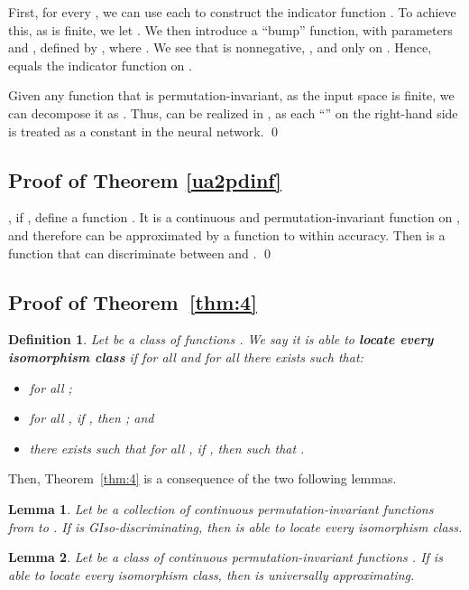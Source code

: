 \documentclass{article}
\newtheorem{lemma}{Lemma}
\newtheorem{definition}{Definition}
\begin{document}
First, for every , we can use each  to construct the indicator function . To achieve this, as  is finite, we let . We then introduce a ``bump'' function,  with parameters  and , defined by , where . We see that  is nonnegative, , and  only on . Hence,  equals the indicator function  on .

Given any function  that is permutation-invariant, as the input space  is finite, we can decompose it as
.
Thus,  can be realized in , as each ``'' on the right-hand side is treated as a constant in the neural network.
\qed

\subsection{Proof of Theorem \ref{ua2pdinf}}
\label{app:pf_thm3}
, if , define a function . It is a continuous and permutation-invariant function on , and therefore can be approximated by a function  to within  accuracy. Then  is a function that can discriminate between  and . \qed

\subsection{Proof of Theorem~\ref{thm:4}}
\label{app:pf_thm4}
\begin{definition}
\label{locate}
Let  be a class of functions . We say it is able to \textbf{locate every isomorphism class} if for all  and for all  there exists  such that:
\begin{itemize}
    \item for all ;
    \item for all , if , then ; and
    \item there exists  such that for all , if , then  such that .
\end{itemize}
\end{definition}

Then, Theorem~\ref{thm:4} is a consequence of the two following lemmas.
\begin{lemma} \label{lemma.C+1}
Let  be a collection of continuous permutation-invariant functions from  to . If  is GIso-discriminating, then  is able to locate every isomorphism class.
\end{lemma}

\begin{lemma} \label{lemma.locate.approx}
Let  be a class of continuous permutation-invariant functions . 
If  is able to locate every isomorphism class, then  is universally approximating.
\end{lemma}
\end{document}
